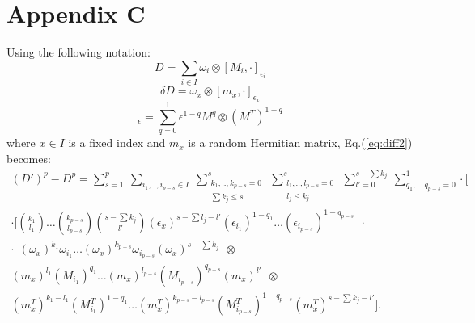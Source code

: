\section*{Appendix C}
Using the following notation:
\begin{equation}
D = \sum_{i \in I} \omega_i \otimes [M_i, \cdot]_{\epsilon_i} 
\end{equation}
\begin{equation}
\delta D = \omega_x \otimes [m_x, \cdot]_{\epsilon_x} 
\end{equation}
\begin{equation}
[M,\cdot]_{\epsilon} = \sum_{q=0}^1 \epsilon^{1-q} M^q \otimes (M^T)^{1-q}
\end{equation}
where $x \in I$ is a fixed index and $m_x$ is a random Hermitian matrix, Eq.(\ref{eq:diff2}) becomes:
\begin{multline}
(D')^p - D^p = \sum_{s=1}^p \ \sum_{i_1,..,i_{p-s} \in I} \  \sum_{\substack{k_1, .., k_{p-s} = 0 \\ \sum k_j \le s}}^s \ \sum_{\substack{l_1, .., l_{p-s} = 0 \\ l_j \le k_j}}^s \ \sum_{l'=0}^{s-\sum k_j} \ \sum_{q_1, .., q_{p-s} = 0}^1 \cdot \Bigg[ \\[1em]
\cdot \Bigg[ \binom{k_1}{l_1} \ldots \binom{k_{p-s}}{l_{p-s}} \binom{s-\sum k_j}{l'} (\epsilon_x)^{s-\sum l_j - l'}(\epsilon_{i_1})^{1-q_1} \ldots (\epsilon_{i_{p-s}})^{1-q_{p-s}} \ \ \cdot \\[1em]
\cdot \ \ (\omega_x)^{k_1} \omega_{i_1} \ldots (\omega_x)^{k_{p-s}} \omega_{i_{p-s}} (\omega_x)^{s-\sum k_j} \ \ \otimes \\[1em]
(m_x)^{l_1} (M_{i_1})^{q_1} \ldots (m_x)^{l_{p-s}} (M_{i_{p-s}})^{q_{p-s}} (m_x)^{l'} \ \ \otimes \\[1em]
(m_x^T)^{k_1-l_1} (M_{i_1}^T)^{1-q_1} \ldots (m_x^T)^{k_{p-s}-l_{p-s}} (M_{i_{p-s}}^T)^{1-q_{p-s}} (m_x^T)^{s-\sum k_j - l'} \Bigg].
\end{multline}


